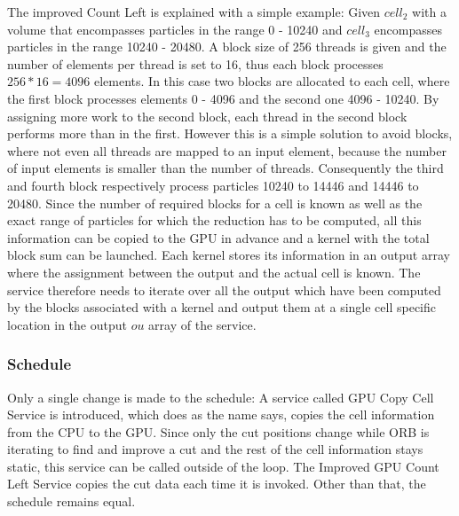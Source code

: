 \documentclass[]{article}
\begin{document}
The improved Count Left is explained with a simple example: Given $cell_2$ with a volume that encompasses particles in the range 0 - 10240 and $cell_3$ encompasses particles in the range 10240 - 20480.  A block size of 256 threads is given and the number of elements per thread is set to 16, thus each block processes $256 * 16 = 4096$ elements. In this case two blocks are allocated to each cell, where the first block processes elements 0 - 4096 and the second one 4096 - 10240. By assigning more work to the second block, each thread in the second block performs more than in the first. However this is a simple solution to avoid blocks, where not even all threads are mapped to an input element, because the number of input elements is smaller than the number of threads. Consequently the third and fourth block respectively process particles 10240 to 14446 and 14446 to 20480. Since the number of required blocks for a cell is known as well as the exact range of particles for which the reduction has to be computed, all this information can be copied to the GPU in advance and a kernel with the total block sum can be launched. 
Each kernel stores its information in an output array where the assignment between the output and the actual cell is known. The service therefore needs to iterate over all the output which have been computed by the blocks associated with a kernel and output them at a single cell specific location in the output $ou$ array of the service.

\subsubsection{Schedule}

Only a single change is made to the schedule: A service called GPU Copy Cell Service is introduced, which does as the name says, copies the cell information from the CPU to the GPU. Since only the cut positions change while ORB is iterating to find and improve a cut and the rest of the cell information stays static, this service can be called outside of the loop. The Improved GPU Count Left Service copies the cut data each time it is invoked. Other than that, the schedule remains equal. 
\end{document}
